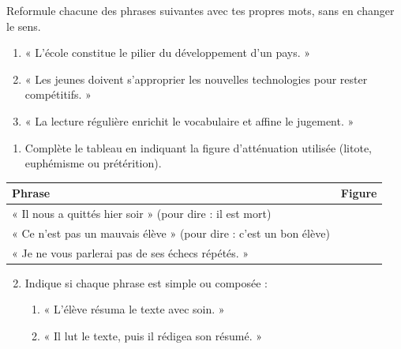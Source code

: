 \documentclass[11pt]{article}
\begin{document}
\begin{exercice}[Reformulation]
Reformule chacune des phrases suivantes avec tes propres mots, sans en changer le sens.
\begin{enumerate}
  \item « L'école constitue le pilier du développement d'un pays. »
  \item « Les jeunes doivent s'approprier les nouvelles technologies pour rester compétitifs. »
  \item « La lecture régulière enrichit le vocabulaire et affine le jugement. »
\end{enumerate}
\end{exercice}

\begin{exercice}
\begin{enumerate}
  \item Complète le tableau en indiquant la figure d'atténuation utilisée (litote, euphémisme ou prétérition).
\end{enumerate}

\begin{center}
\begin{tabular}{|p{7cm}|p{4cm}|}
\hline
\textbf{Phrase} & \textbf{Figure} \\
\hline
« Il nous a quittés hier soir » (pour dire : il est mort) & \\
\hline
« Ce n'est pas un mauvais élève » (pour dire : c'est un bon élève) & \\
\hline
« Je ne vous parlerai pas de ses échecs répétés. » & \\
\hline
\end{tabular}
\end{center}

\begin{enumerate}
  \setcounter{enumi}{1}
  \item Indique si chaque phrase est simple ou composée :
  \begin{enumerate}
    \item « L'élève résuma le texte avec soin. »
    \item « Il lut le texte, puis il rédigea son résumé. »
  \end{enumerate}
\end{enumerate}
\end{exercice}
\end{document}
